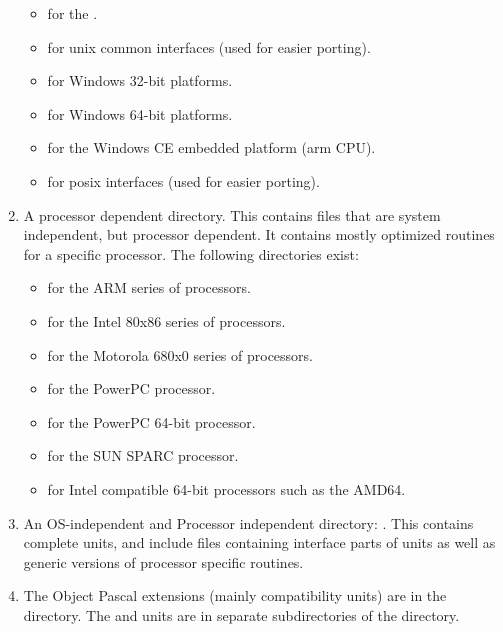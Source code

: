 \begin{enumerate}
\begin{itemize}
\item {} for the \qnx.
\item {} for unix common interfaces (used for easier porting).
\item {} for Windows 32-bit platforms.
\item {} for Windows 64-bit platforms.
\item {} for the Windows CE embedded platform (arm CPU).
\item {} for posix interfaces (used for easier porting).
\end{itemize}
\item A processor dependent directory. This contains files that are system
independent, but processor dependent. It contains mostly optimized routines
for a specific processor. The following directories exist:
\begin{itemize}
\item {} for the ARM series of processors.
\item {} for the Intel 80x86 series of processors.
\item {} for the Motorola 680x0 series of processors.
\item {} for the PowerPC processor.
\item {} for the PowerPC 64-bit processor.
\item {} for the SUN SPARC processor.
\item {} for Intel compatible 64-bit processors such as the AMD64.
\end{itemize}
\item An OS-independent and Processor independent directory: . This
contains complete units, and include files containing interface parts of
units as well as generic versions of processor specific routines.
\item The Object Pascal extensions (mainly \delphi compatibility units) are
in the  directory. The  and  units
are in separate subdirectories of the  directory.
\end{enumerate}


